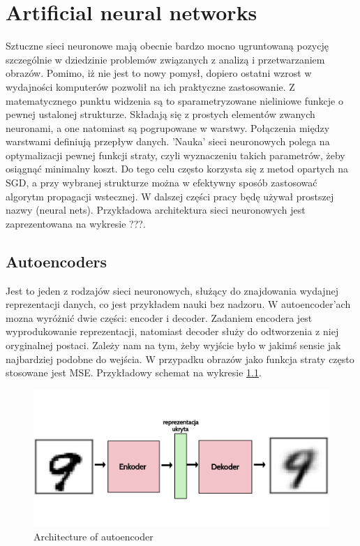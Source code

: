 \chapter{Artificial neural networks}

Sztuczne sieci neuronowe mają obecnie bardzo mocno ugruntowaną pozycję szczególnie w dziedzinie problemów związanych z analizą i przetwarzaniem obrazów. Pomimo, iż nie jest to nowy pomysł, dopiero ostatni wzrost w wydajności komputerów pozwolił na ich praktyczne zastosowanie. Z matematycznego punktu widzenia są to sparametryzowane nieliniowe funkcje o pewnej ustalonej strukturze. Składają się z prostych elementów zwanych neuronami, a one natomiast są pogrupowane w warstwy. Połączenia między warstwami definiują przepływ danych. 'Nauka' sieci neuronowych polega na optymalizacji pewnej funkcji straty, czyli wyznaczeniu takich parametrów, żeby osiągnąć minimalny koszt. Do tego celu często korzysta się z metod opartych na SGD, a przy wybranej strukturze można w efektywny sposób zastosować algorytm propagacji wstecznej. W dalszej części pracy będę używał prostszej nazwy (neural nets). Przykładowa architektura sieci neuronowych jest zaprezentowana na wykresie ???.

\section{Autoencoders}

Jest to jeden z rodzajów sieci neuronowych, służący do znajdowania wydajnej reprezentacji danych, co jest przykładem nauki bez nadzoru. W autoencoder'ach mozna wyróżnić dwie części: encoder i decoder. Zadaniem encodera jest wyprodukowanie reprezentacji, natomiast decoder służy do odtworzenia z niej oryginalnej postaci. Zależy nam na tym, żeby wyjście było w jakimś sensie jak najbardziej podobne do wejścia. W przypadku obrazów jako funkcja straty często stosowane jest MSE. Przykładowy schemat na wykresie \ref{fig:autoenc}.

\begin{figure}[h!]
    \centering
    \includegraphics[width=1\textwidth]{images/autoenc}
    \caption{Architecture of autoencoder}
    \label{fig:autoenc}
\end{figure}

